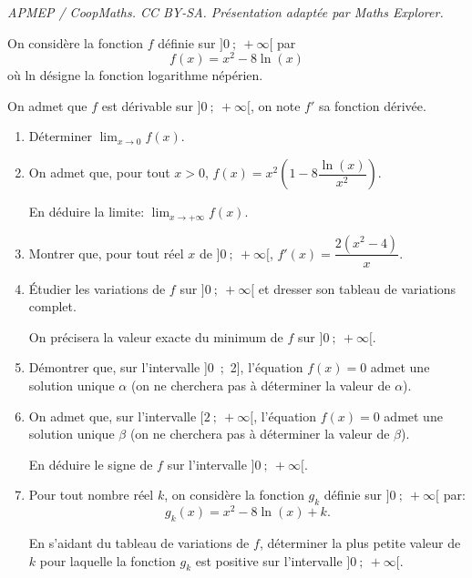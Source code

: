 \documentclass[10pt]{article}
\begin{document}
\noindent\textit{APMEP / CoopMaths. CC BY-SA. Présentation adaptée par Maths Explorer.}\par\medskip
\medskip

On considère la fonction $f$ définie sur $]0~;~+\infty[$ par
\[f(x) = x^2 - 8\ln (x)\]
où ln désigne la fonction logarithme népérien.

On admet que $f$ est dérivable sur $]0~;~+\infty[$, on note $f'$ sa fonction dérivée. 

\medskip

\begin{enumerate}
\item Déterminer $\displaystyle\lim_{x \to 0} f(x)$.
\item On admet que, pour tout $x > 0$,\: $f(x) = x^2\left(1 - 8\dfrac{\ln (x)}{x^2}\right)$.

En déduire la limite: $\displaystyle\lim_{x \to + \infty} f(x)$.
\item Montrer que, pour tout réel $x$ de $]0~;~+\infty[$, $f'(x) = \dfrac{2\left(x^2 - 4\right)}{x}$.
\item Étudier les variations de $f$ sur $]0~;~+\infty[$ et dresser son tableau de variations complet.

On précisera la valeur exacte du minimum de $f$ sur $]0~;~+\infty[$.
\item Démontrer que, sur l'intervalle ]0~;~2], l'équation $f(x) = 0$ admet une solution
unique $\alpha$ (on ne cherchera pas à déterminer la valeur de $\alpha$).
\item On admet que, sur l'intervalle $[2~;~ +\infty[$, l'équation $f(x) = 0$ admet une solution unique $\beta$ (on ne cherchera pas à déterminer la valeur de $\beta$).

En déduire le signe de $f$ sur l'intervalle $]0~;~+\infty[$.
\item Pour tout nombre réel $k$, on considère la fonction $g_k$ définie sur $]0~;~+\infty[$ par:
\[g_k(x) = x^2 - 8\ln (x) + k.\]

En s'aidant du tableau de variations de $f$, déterminer la plus petite valeur de $k$
pour laquelle la fonction $g_k$ est positive sur l'intervalle $]0~;~+\infty[$.
\end{enumerate}

\bigskip
\end{document}

